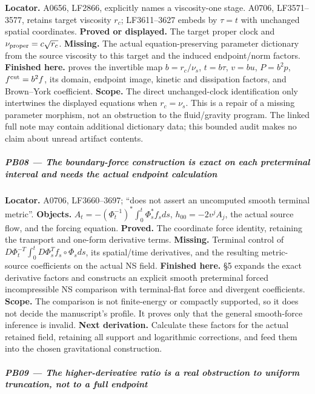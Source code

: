 \textbf{Locator.} A0656, LF2866, explicitly names a viscosity-one stage.
A0706, LF3571--3577, retains target viscosity \(r_c\); LF3611--3627
embeds by \(\tau=t\) with unchanged spatial coordinates. \textbf{Proved
or displayed.} The target proper clock and
\(\nu_{\rm proper}=c\sqrt{r_c}\). \textbf{Missing.} The actual
equation-preserving parameter dictionary from the source viscosity to
this target and the induced endpoint/norm factors. \textbf{Finished
here.} \protect{} proves the invertible map
\(b=r_c/\nu_s\), \(t=b\tau\), \(v=bu\), \(P=b^2p\),
\(f^{\rm cut}=b^2f\), its domain, endpoint image, kinetic and
dissipation factors, and Brown--York coefficient. \textbf{Scope.} The
direct unchanged-clock identification only intertwines the displayed
equations when \(r_c=\nu_s\). This is a repair of a missing parameter
morphism, not an obstruction to the fluid/gravity program. The linked
full note may contain additional dictionary data; this bounded audit
makes no claim about unread artifact contents.

\subparagraph{PB08 --- The boundary-force construction is exact on each
preterminal interval and needs the actual endpoint
calculation}\label{pb08-the-boundary-force-construction-is-exact-on-each-preterminal-interval-and-needs-the-actual-endpoint-calculation}

\textbf{Locator.} A0706, LF3660--3697; ``does not assert an uncomputed
smooth terminal metric''. \textbf{Objects.}
\(A_t=-(\Phi_t^{-1})^*\int_0^t\Phi_s^*f_sds\), \(h_{00}=-2v^jA_j\), the
actual source flow, and the forcing equation. \textbf{Proved.} The
coordinate force identity, retaining the transport and one-form
derivative terms. \textbf{Missing.} Terminal control of
\(D\Phi_t^{-T}\int_0^tD\Phi_s^Tf_s\circ\Phi_sds\), its spatial/time
derivatives, and the resulting metric-source coefficients on the actual
NS field. \textbf{Finished here.} \protect{} §5
expands the exact derivative factors and constructs an explicit smooth
preterminal forced incompressible NS comparison with terminal-flat force
and divergent coefficients. \textbf{Scope.} The comparison is not
finite-energy or compactly supported, so it does not decide the
manuscript's profile. It proves only that the general smooth-force
inference is invalid. \textbf{Next derivation.} Calculate these factors
for the actual retained field, retaining all support and logarithmic
corrections, and feed them into the chosen gravitational construction.

\subparagraph{PB09 --- The higher-derivative ratio is a real obstruction
to uniform truncation, not to a full
endpoint}\label{pb09-the-higher-derivative-ratio-is-a-real-obstruction-to-uniform-truncation-not-to-a-full-endpoint}

